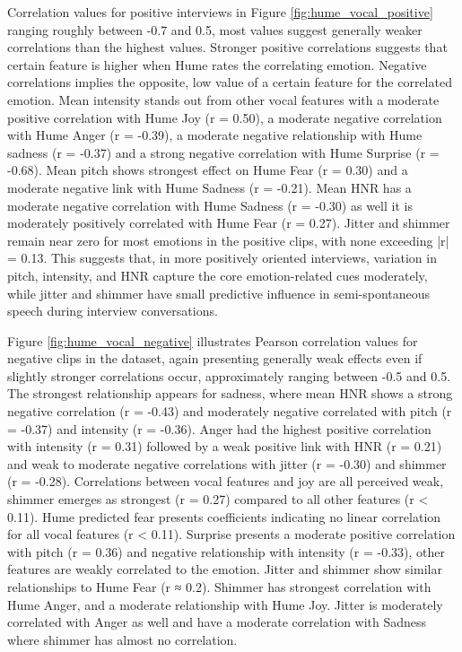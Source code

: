 Correlation values for positive interviews in Figure \ref{fig:hume_vocal_positive} ranging roughly between -0.7 and 0.5, most values suggest generally weaker correlations than the highest values. Stronger positive correlations 
suggests that certain feature is higher when Hume rates the correlating emotion. Negative correlations implies the opposite, low value of a certain feature for the correlated emotion. 
Mean intensity stands out from other vocal features with a moderate positive correlation with Hume Joy (r = 0.50), a moderate negative correlation with Hume Anger (r = -0.39), a moderate negative relationship with Hume sadness (r = -0.37) and a strong negative correlation with Hume Surprise (r = -0.68). 
Mean pitch shows strongest effect on Hume Fear (r = 0.30) and a moderate negative link with Hume Sadness (r = -0.21). 
Mean HNR has a moderate negative correlation with Hume Sadness (r = -0.30) as well it is moderately positively correlated with Hume Fear (r = 0.27). 
Jitter and shimmer remain near zero for most emotions in the positive clips, with none exceeding |r| = 0.13. This suggests that, in more positively oriented interviews, 
variation in pitch, intensity, and HNR capture the core emotion-related cues moderately, while jitter and shimmer have small predictive influence in semi-spontaneous speech during interview conversations. 

Figure \ref{fig:hume_vocal_negative} illustrates Pearson correlation values for negative clips in the dataset, again presenting generally weak effects even if slightly stronger correlations occur, approximately ranging between -0.5 and 0.5. 
The strongest relationship appears for sadness, where mean HNR shows a strong negative correlation (r = -0.43) and moderately negative correlated with pitch (r = -0.37) and intensity (r = -0.36). 
Anger had the highest positive correlation with intensity (r = 0.31) followed by a weak positive link with HNR (r = 0.21) and weak to moderate negative correlations with jitter (r = -0.30) and shimmer (r = -0.28). 
Correlations between vocal features and joy are all perceived weak, shimmer emerges as strongest (r = 0.27) compared to all other features (r < 0.11). 
Hume predicted fear presents coefficients indicating no linear correlation for all vocal features (r < 0.11). Surprise presents a moderate positive correlation with pitch (r = 0.36) and negative relationship with intensity (r = -0.33), other features are weakly correlated to the emotion.
Jitter and shimmer show similar relationships to Hume Fear (r ≈ 0.2). Shimmer has strongest correlation with Hume Anger, and a moderate relationship with Hume Joy. Jitter is moderately correlated with Anger as well and have a moderate correlation with Sadness where shimmer has almost no correlation. 

